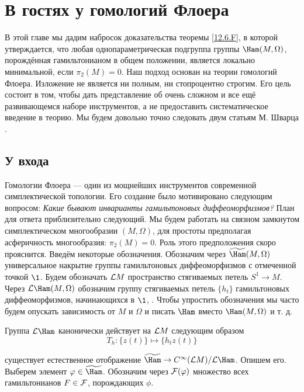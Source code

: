 \chapter[Гомологии Флоера]{В гостях у гомологий Флоера}\label{13}

В этой главе мы дадим набросок доказательства теоремы
\ref{12.6.F}, в которой утверждается, что любая однопараметрическая
подгруппа группы $\Ham(M, \Omega)$, порождённая гамильтонианом в общем
положении, является локально минимальной, если $π_{2}(M) = 0$.
Наш подход основан на теории гомологий Флоера.
Изложение не является
ни полным, ни стопроцентно строгим.
Его цель состоит в том, чтобы дать представление об очень сложном и
все ещё развивающемся наборе инструментов, а не
предоставить систематическое введение в теорию.
Мы будем довольно точно следовать двум статьям М. Шварца \cite{Sch2,
  Sch3}.

\section{У входа}\label{13.1}

Гомологии Флоера — один из мощнейших инструментов современной
симплектической топологии. 
Его создание было мотивировано следующим вопросом:
\textit{Какие бывают инварианты гамильтоновых диффеоморфизмов?}
План для ответа приблизительно следующий.
Мы будем работать на связном замкнутом симплектическом многообразии
$(M,\Omega)$, для простоты предполагая асферичность многообразия:
$π_{2}(M) = 0$.
Роль этого предположения скоро прояснится.
Введём некоторые обозначения.
Обозначим через $\widetilde\Ham(M,\Omega)$ универсальное накрытие
группы гамильтоновых диффеоморфизмов с отмеченной точкой $\1$.
Будем обозначать $\mathcal{L} M$ пространство стягиваемых петель $S^{1}\to
M$.
Через $\L\Ham(M,\Omega)$ обозначим группу стягиваемых петель
$\{h_{t}\}$ гамильтоновых 
диффеоморфизмов, 
начинающихся в $\1$,
.
Чтобы упростить обозначения мы часто будем опускать зависимость от $M$
и $\Omega$ и писать $\Ham$ вместо $\Ham(M, \Omega)$ и т. д. 

Группа $\L\Ham$ канонически действует на $\mathcal{L} M$
следующим образом
\[
T_{h}: \{z(t)\}\mapsto \{h_{t}z(t)\}
\]

  
 существует естественное
отображение $\widetilde\Ham\z\to C^{\infty}(\L M)/\L\Ham$.
Опишем его.
Выберем элемент $\phi\in\widetilde\Ham$.
Обозначим
через $\mathcal{F}(\varphi)$ множество всех гамильтонианов $F\in\mathcal{F}$,
порождающих $\phi$.

